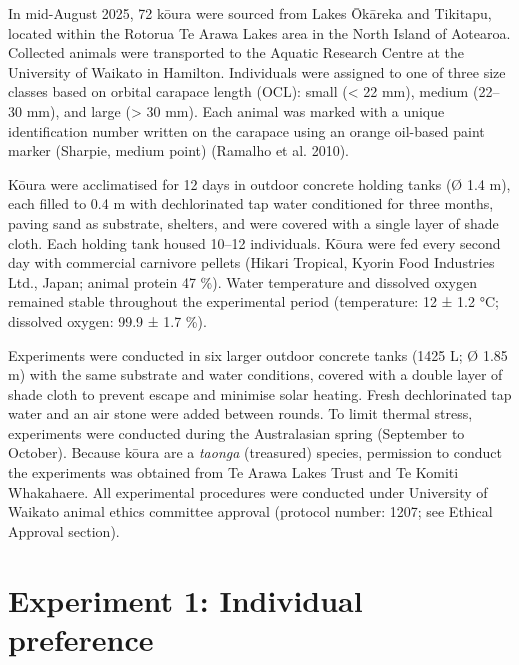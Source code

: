 \documentclass[
  12pt,
  a4paper,
]{scrbook}
\begin{document}
In mid-August 2025, 72 kōura were sourced from Lakes Ōkāreka and
Tikitapu, located within the Rotorua Te Arawa Lakes area in the North
Island of Aotearoa. Collected animals were transported to the Aquatic
Research Centre at the University of Waikato in Hamilton. Individuals
were assigned to one of three size classes based on orbital carapace
length (OCL): small (\textless{} 22 mm), medium (22--30 mm), and large
(\textgreater{} 30 mm). Each animal was marked with a unique
identification number written on the carapace using an orange oil-based
paint marker (Sharpie, medium point) (Ramalho et al. 2010).

Kōura were acclimatised for 12 days in outdoor concrete holding tanks (Ø
1.4 m), each filled to 0.4 m with dechlorinated tap water conditioned
for three months, paving sand as substrate, shelters, and were covered
with a single layer of shade cloth. Each holding tank housed 10--12
individuals. Kōura were fed every second day with commercial carnivore
pellets (Hikari Tropical, Kyorin Food Industries Ltd., Japan; animal
protein 47 \%). Water temperature and dissolved oxygen remained stable
throughout the experimental period (temperature: 12 ± 1.2 °C; dissolved
oxygen: 99.9 ± 1.7 \%).

Experiments were conducted in six larger outdoor concrete tanks (1425 L;
Ø 1.85 m) with the same substrate and water conditions, covered with a
double layer of shade cloth to prevent escape and minimise solar
heating. Fresh dechlorinated tap water and an air stone were added
between rounds. To limit thermal stress, experiments were conducted
during the Australasian spring (September to October). Because kōura are
a \emph{taonga} (treasured) species, permission to conduct the
experiments was obtained from Te Arawa Lakes Trust and Te Komiti
Whakahaere. All experimental procedures were conducted under University
of Waikato animal ethics committee approval (protocol number: 1207; see
Ethical Approval section).

\section{Experiment 1: Individual
preference}\label{experiment-1-individual-preference}
\end{document}
